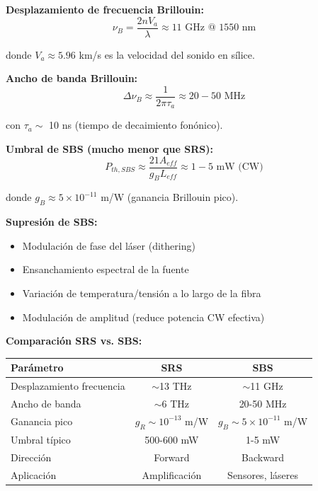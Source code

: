 \documentclass[11pt,a4paper]{article}
\begin{document}
\textbf{Desplazamiento de frecuencia Brillouin:}
\begin{equation}
    \nu_B = \frac{2nV_a}{\lambda} \approx 11 \text{ GHz @ 1550 nm}
\end{equation}

donde $V_a \approx 5.96$ km/s es la velocidad del sonido en sílice.

\textbf{Ancho de banda Brillouin:}
\begin{equation}
    \Delta\nu_B \approx \frac{1}{2\pi\tau_a} \approx 20-50 \text{ MHz}
\end{equation}

con $\tau_a \sim$ 10 ns (tiempo de decaimiento fonónico).

\textbf{Umbral de SBS (mucho menor que SRS):}
\begin{equation}
    P_{th,SBS} \approx \frac{21 A_{eff}}{g_B L_{eff}} \approx 1-5 \text{ mW (CW)}
\end{equation}

donde $g_B \approx 5 \times 10^{-11}$ m/W (ganancia Brillouin pico).

\textbf{Supresión de SBS:}
\begin{itemize}
    \item Modulación de fase del láser (dithering)
    \item Ensanchamiento espectral de la fuente
    \item Variación de temperatura/tensión a lo largo de la fibra
    \item Modulación de amplitud (reduce potencia CW efectiva)
\end{itemize}

\begin{nota}
\textbf{Comparación SRS vs. SBS:}

\begin{tabular}{lcc}
\hline
\textbf{Parámetro} & \textbf{SRS} & \textbf{SBS} \\
\hline
Desplazamiento frecuencia & $\sim$13 THz & $\sim$11 GHz \\
Ancho de banda & $\sim$6 THz & 20-50 MHz \\
Ganancia pico & $g_R \sim 10^{-13}$ m/W & $g_B \sim 5\times10^{-11}$ m/W \\
Umbral típico & 500-600 mW & 1-5 mW \\
Dirección & Forward & Backward \\
Aplicación & Amplificación & Sensores, láseres \\
\hline
\end{tabular}
\end{nota}
\end{document}
